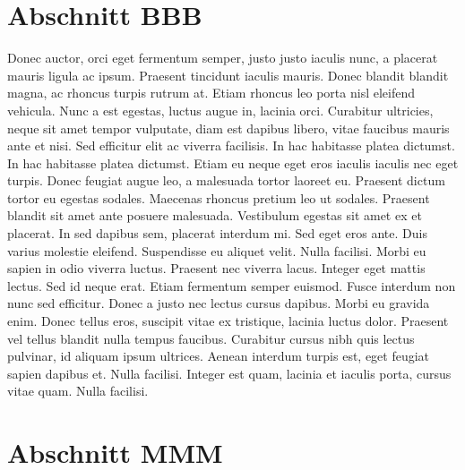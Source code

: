 \section{Abschnitt BBB}

Donec auctor, orci eget fermentum semper, justo justo iaculis nunc, a placerat mauris ligula ac ipsum. Praesent tincidunt iaculis mauris. Donec blandit blandit magna, ac rhoncus turpis rutrum at. Etiam rhoncus leo porta nisl eleifend vehicula. Nunc a est egestas, luctus augue in, lacinia orci. Curabitur ultricies, neque sit amet tempor vulputate, diam est dapibus libero, vitae faucibus mauris ante et nisi. Sed efficitur elit ac viverra facilisis. In hac habitasse platea dictumst. In hac habitasse platea dictumst. Etiam eu neque eget eros iaculis iaculis nec eget turpis.\newpar
Donec feugiat augue leo, a malesuada tortor laoreet eu. Praesent dictum tortor eu egestas sodales. Maecenas rhoncus pretium leo ut sodales. Praesent blandit sit amet ante posuere malesuada. Vestibulum egestas sit amet ex et placerat. In sed dapibus sem, placerat interdum mi. Sed eget eros ante. Duis varius molestie eleifend. Suspendisse eu aliquet velit. Nulla facilisi. Morbi eu sapien in odio viverra luctus.\newpar
Praesent nec viverra lacus. Integer eget mattis lectus. Sed id neque erat. Etiam fermentum semper euismod. Fusce interdum non nunc sed efficitur. Donec a justo nec lectus cursus dapibus. Morbi eu gravida enim. Donec tellus eros, suscipit vitae ex tristique, lacinia luctus dolor. Praesent vel tellus blandit nulla tempus faucibus. Curabitur cursus nibh quis lectus pulvinar, id aliquam ipsum ultrices. Aenean interdum turpis est, eget feugiat sapien dapibus et. Nulla facilisi. Integer est quam, lacinia et iaculis porta, cursus vitae quam. Nulla facilisi.

\section{Abschnitt MMM}

